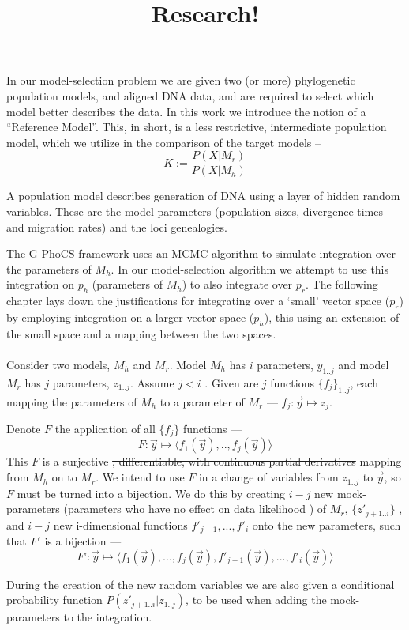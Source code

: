 \documentclass[10pt,a4paper]{article}
\title{Research!}
\begin{document}
\maketitle


In our model-selection problem we are given two (or more) phylogenetic population models, and aligned DNA data, and are required to select which model better describes the data. 
In this work we introduce the notion of a “Reference Model”. This, in short, is a less restrictive, intermediate population model, which we utilize in the comparison of the target models – 
\[K:=\frac{P(X|M_r)}{P(X|M_h)}\]

A population model describes generation of DNA using a layer of hidden random variables. These are the model parameters (population sizes, divergence times and migration rates) and the loci genealogies.

The G-PhoCS framework uses an MCMC algorithm to simulate integration over the parameters of $M_h$. In our model-selection algorithm we attempt to use this integration on $p_h$ (parameters of $M_h$) to also integrate over $p_r$. The following chapter lays down the justifications for integrating over a ‘small’ vector space ($p_r$) by employing integration on a larger vector space ($p_h$), this using an extension of the small space and a mapping between the two spaces.\\
\\
Consider two models, $M_h$ and $M_r$. Model $M_h$ has $i$ parameters, $y_{1..j}$ and model $M_r$ has $j$ parameters, $z_{1..j}$.  Assume $j<i$ .
Given are $j$ functions $\{f_j\}_{1..j}$, each mapping the parameters of $M_h$ to a parameter of $M_r$ --- $f_j: \vec{y} \mapsto z_j$. 

Denote $F$ the application of all $\{f_j\}$ functions --- 
\[F: \vec{y} \mapsto \langle f_1(\vec{y} ), .., f_j(\vec{y} ) \rangle \]
 This $F$ is a surjective \sout{, differentiable, with continuous partial derivatives} mapping  from $M_h$ on to $M_r$. We intend to use $F$ in a change of variables from $z_{1..j}$ to $\vec{y}$, so $F$ must be turned into a bijection. We do this by creating $i-j$ new mock-parameters (parameters who have no effect on data likelihood ) of $M_r$, $\{z'_{j+1..i}\}$ , and $i-j$ new i-dimensional functions ${f'_{j+1}, ..., f'_i}$ onto the new parameters, such that $F'$ is a bijection ---
 \[F’:\vec{y} \mapsto \langle f_1(\vec{y} ), ..., f_j( \vec{y} ),f'_{j+1}(\vec{y} ), ..., f'_{i}(\vec{y})\rangle\] 

During the creation of the new random variables we are also given a conditional probability function $P(z'_{j+1..i} | z_{1..j})$, to be used when adding the mock-parameters to the integration.
\end{document}
